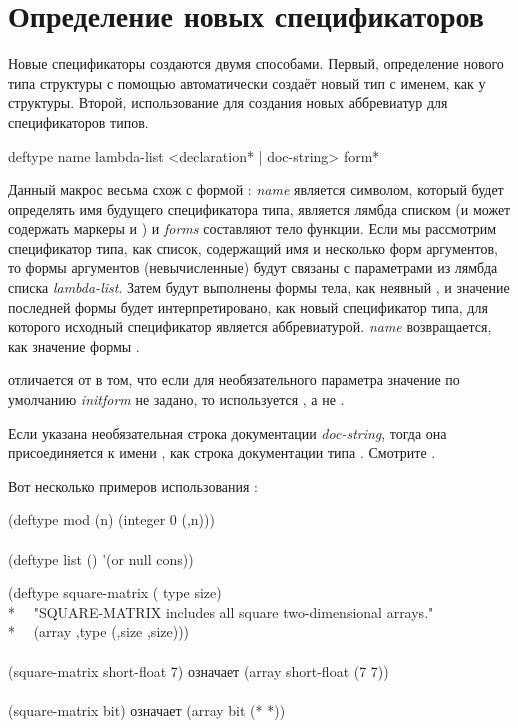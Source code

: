 \section{Определение новых спецификаторов}

Новые спецификаторы создаются двумя способами.
Первый, определение нового типа структуры с помощью  автоматически
создаёт новый тип с именем, как у структуры.
Второй, использование  для создания новых аббревиатур для
спецификаторов типов.

\begin{defmac}
deftype name lambda-list
  <{declaration}* | doc-string> {form}*

Данный макрос весьма схож с формой : \emph{name} является
символом, который будет определять имя будущего спецификатора типа,
 является лямбда списком (и может содержать маркеры  и
) и \emph{forms} составляют тело функции. Если мы рассмотрим
спецификатор типа, как список, содержащий имя и несколько форм аргументов, то
формы аргументов (невычисленные) будут связаны с параметрами из лямбда списка
\emph{lambda-list}. Затем будут выполнены формы тела, как неявный ,
и значение последней формы будет интерпретировано, как новый спецификатор типа,
для которого исходный спецификатор является аббревиатурой. \emph{name}
возвращается, как значение формы .

 отличается от  в том, что если для необязательного 
параметра значение по умолчанию \emph{initform} не задано, то используется
\cd{*}, а не {\nil}.

Если указана необязательная строка документации \emph{doc-string}, тогда она
присоединяется к имени , как строка документации типа .
Смотрите .

Вот несколько примеров использования :
\begin{lisp}
(deftype mod (n) {\Xbq}(integer 0 (,n))) \\
 \\
(deftype list () '(or null cons))
\end{lisp}

\begin{lisp}
(deftype square-matrix ( type size) \\*
~~"SQUARE-MATRIX includes all square two-dimensional arrays." \\*
~~{\Xbq}(array ,type (,size ,size))) \\
 \\
(square-matrix short-float 7)  \textrm{означает}  (array short-float (7 7)) \\
 \\
(square-matrix bit)  \textrm{означает}  (array bit (* *))
\end{lisp}


\end{defmac}

